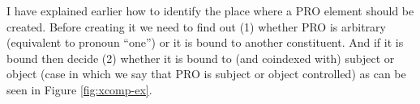 
I have explained earlier how to identify the place where a PRO element should be created. Before creating it we need to find out (1) whether PRO is arbitrary (equivalent to pronoun ``one'') or it is bound to another constituent. And if it is bound then decide (2) whether it is bound to (and coindexed with) subject or object (case in which we say that PRO is subject or object controlled) as can be seen in Figure \ref{fig:xcomp-ex}.


